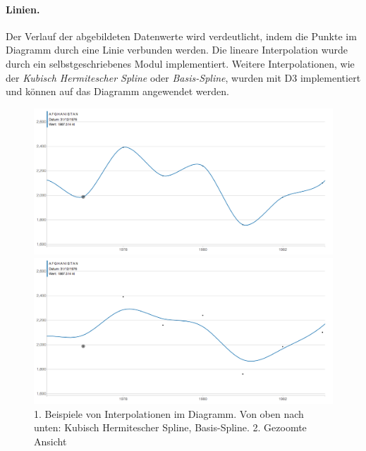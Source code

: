\paragraph{Linien.} Der Verlauf der abgebildeten Datenwerte wird verdeutlicht, indem die Punkte im Diagramm durch eine Linie verbunden werden. Die lineare Interpolation wurde durch ein selbstgeschriebenes Modul implementiert. Weitere Interpolationen, wie der \textit{Kubisch Hermitescher Spline} oder \textit{Basis-Spline}, wurden mit D3 implementiert und können auf das Diagramm angewendet werden.

\begin{figure}[!htbp]
	\begin{minipage}{\textwidth}
		\centering
		\includegraphics[width=\linewidth]{images/cardinal}
	\end{minipage}
	\begin{minipage}{\textwidth}
		\centering
		\includegraphics[width=\linewidth]{images/basis}
	\end{minipage}
	\caption[Beispiele von Interpolationen und Zoom]{1. Beispiele von Interpolationen im Diagramm. Von oben nach unten: Kubisch Hermitescher Spline, Basis-Spline. 2. Gezoomte Ansicht}
	\label{fig:vergleich}
\end{figure}

